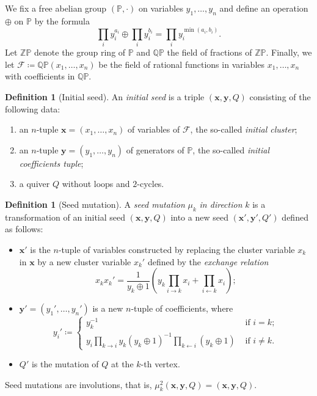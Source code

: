 \documentclass[a4paper,oneside,svgnames,draft]{amsart}
\theoremstyle{plain}
\theoremstyle{definition}
\newtheorem{definition}[theorem]{Definition}
\begin{document}
 We fix a free abelian group $(\mathbb{P}, \cdot )$ on variables
 $y_1,\ldots,y_n$ and define an operation $ \oplus $ on $\mathbb{P}$ by the
 formula
 \[
  \prod_i y_i^{a_i} \oplus \prod_i y_i^{b_i} = \prod_i y_i^{\min(a_i,b_i)}.
 \]
 Let $\mathbb{Z}\mathbb{P}$ denote the group ring of $\mathbb{P}$ and
 $\mathbb{Q}\mathbb{P}$ the field of fractions of $\mathbb{Z}\mathbb{P}$.
 Finally, we let $\mathcal{F} \coloneqq \mathbb{Q}\mathbb{P}(x_1,\ldots,x_n)$ be
 the field of rational functions in variables $x_1,\ldots,x_n$ with coefficients
 in $\mathbb{Q}\mathbb{P}$.

 \begin{definition}[Initial seed]
  An \emph{initial seed} is a triple $(\mathbf{x},\mathbf{y},Q)$ consisting of
  the following data:
  \begin{enumerate}
   \item an $n$-tuple $\mathbf{x} = (x_1,\ldots,x_n)$ of variables of
    $\mathcal{F}$, the so-called \emph{initial cluster};
   \item an $n$-tuple $\mathbf{y} = (y_1,\ldots,y_n)$ of generators of
    $\mathbb{P}$, the so-called \emph{initial coefficients tuple};
   \item a quiver $Q$ without loops and $2$-cycles.
  \end{enumerate}
 \end{definition}

 \begin{definition}[Seed mutation]
  A \emph{seed mutation} $\mu_k$ \emph{in direction} $k$ is a transformation of
  an initial seed $(\mathbf{x},\mathbf{y},Q)$ into a new seed
  $(\mathbf{x'},\mathbf{y'},Q')$ defined as follows:
  \begin{itemize}
   \item $\mathbf{x'}$ is the $n$-tuple of variables constructed by replacing
    the cluster variable $x_k$ in $\mathbf{x}$ by a new cluster variable $x_k'$
    defined by the \emph{exchange relation}
    \[
     x_kx_k' = \frac{1}{y_k \oplus 1}\left( y_k \prod_{i \to k} x_i +
     \prod_{i \leftarrow k} x_i \right);
    \]
   \item $\mathbf{y'} = (y_1',\ldots,y_n')$ is a new $n$-tuple of coefficients,
    where
    \[
     y_i' \coloneqq \begin{cases}
      y_k^{-1} & \text{ if } i = k;\\
      y_i \prod_{k \to i} y_k(y_k \oplus 1)^{-1}\prod_{k \leftarrow i} (y_k
      \oplus 1) & \text{ if } i \neq k.
     \end{cases}
    \]
   \item $Q'$ is the mutation of $Q$ at the $k$-th vertex.
  \end{itemize}
 \end{definition}
 Seed mutations are involutions, that is, $\mu_k^2(\mathbf{x},\mathbf{y},Q) =
 (\mathbf{x},\mathbf{y},Q)$.
\end{document}
